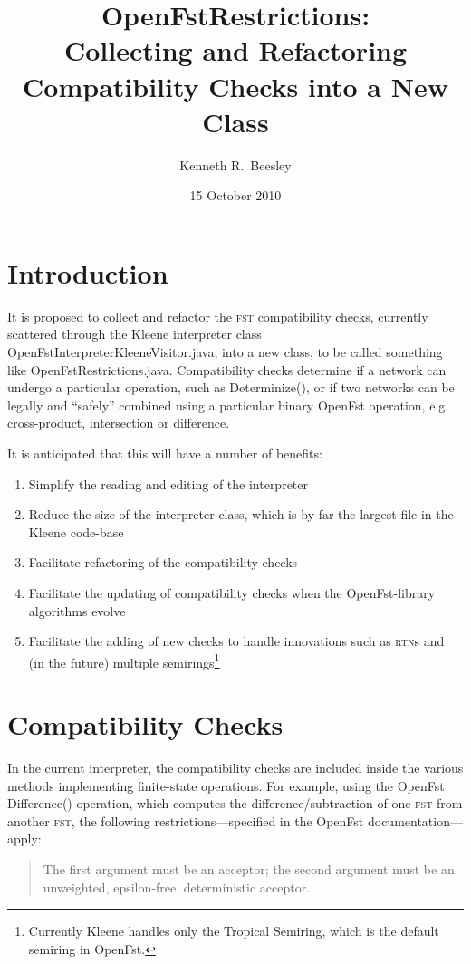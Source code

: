 \documentclass[letterpaper,12pt]{article}
\title{OpenFstRestrictions:\\
Collecting and Refactoring Compatibility Checks into a New Class}
\author{Kenneth R.~Beesley}
\date{15 October 2010}
\providecommand{\acro}{}\renewcommand{\acro}{\textsc}
\begin{document}
\maketitle

\section{Introduction}

It is proposed to collect and refactor the \acro{fst} compatibility checks,
currently scattered through the Kleene interpreter
class OpenFstInterpreterKleeneVisitor.java, into a new class, to be called
something like OpenFstRestrictions.java.  Compatibility checks determine
if a network can undergo a particular operation, such as Determinize(), or if two 
networks can be legally and ``safely'' combined using a
particular binary OpenFst operation, e.g.
cross-product, intersection or difference.

It is anticipated that this will have a number of benefits:

\begin{enumerate}
\item
Simplify the reading and editing of the interpreter
\item
Reduce the size of the interpreter class, which is by far the largest file in the Kleene
code-base
\item
Facilitate refactoring of the compatibility checks
\item
Facilitate the updating of compatibility checks when the OpenFst-library algorithms
evolve
\item
Facilitate the adding of new checks to handle innovations such as \acro{rtn}s and
(in the future) multiple semirings\footnote{Currently Kleene handles only the
Tropical Semiring, which is the default semiring in OpenFst.}
\end{enumerate}

\section{Compatibility Checks}

In the current interpreter, the compatibility checks are included inside the
various methods implementing finite-state operations.  For example, using the
OpenFst Difference() operation, which computes the difference/subtraction of one
\acro{fst} from another \acro{fst}, the following restrictions---specified in the OpenFst
documentation---apply:

\begin{quote}
The first argument must be an acceptor; the second argument must be an unweighted,
epsilon-free, deterministic acceptor.
\end{quote}
\end{document}
